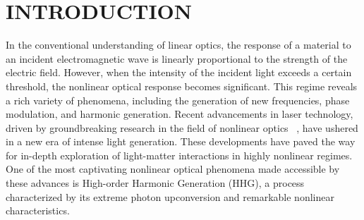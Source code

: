 

\chapter{INTRODUCTION } 
\label{ch:introduction}
In the conventional understanding of linear optics, the response of a material to an incident electromagnetic wave is linearly proportional to the strength of the electric field. However, when the intensity of the incident light exceeds a certain threshold, the nonlinear optical response becomes significant. This regime reveals a rich variety of phenomena, including the generation of new frequencies, phase modulation, and harmonic generation.
Recent advancements in laser technology, driven by groundbreaking research in the field of nonlinear optics ~\cite{RevModPhys.72.545, RevModPhys.81.163, MOUROU2012720}, have ushered in a new era of intense light generation. These developments have paved the way for in-depth exploration of light-matter interactions in highly nonlinear regimes. One of the most captivating nonlinear optical phenomena made accessible by these advances is High-order Harmonic Generation (\gls{HHG}), a process characterized by its extreme photon upconversion and remarkable nonlinear characteristics. 
